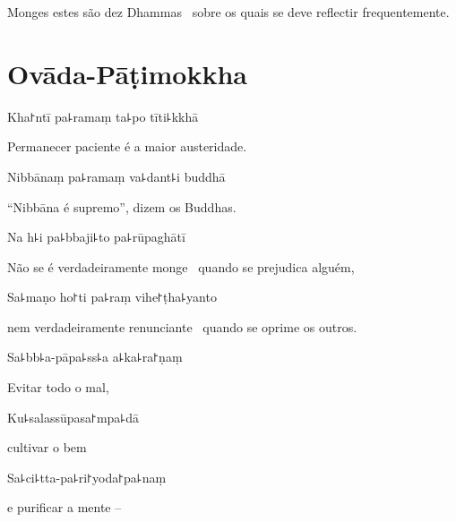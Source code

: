 \begin{english}
  Monges estes são dez Dhammas \pause\ sobre os quais se deve reflectir frequentemente.
\end{english}

\chapter{Ovāda-Pāṭimokkha}


\enlargethispage{\baselineskip}

\begin{leader}
\end{leader}

Kha꜓ntī pa꜕ramaṃ ta꜕po tīti꜕kkhā

\begin{english}
  Permanecer paciente é a maior austeridade.
\end{english}

Nibbānaṃ pa꜕ramaṃ va꜕dant꜕i buddhā

\begin{english}
  “Nibbāna é supremo”, dizem os Buddhas.
\end{english}

Na h꜕i pa꜕bbaji꜕to pa꜕rūpaghātī

\begin{english}
  Não se é verdadeiramente monge \pause\ quando se prejudica alguém,
\end{english}

Sa꜕maṇo ho꜓ti pa꜕raṃ vihe꜓ṭha꜕yanto

\begin{english}
  nem verdadeiramente renunciante \pause\ quando se oprime os outros.
\end{english}

Sa꜕bb꜕a-pāpa꜕ss꜕a a꜕ka꜕ra꜓ṇaṃ

\begin{english}
  Evitar todo o mal,
\end{english}

Ku꜕salassūpasa꜓mpa꜕dā

\begin{english}
  cultivar o bem
\end{english}

Sa꜕ci꜕tta-pa꜕ri꜓yoda꜓pa꜕naṃ

\begin{english}
  e purificar a mente --
\end{english}

